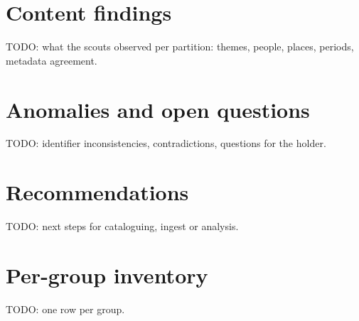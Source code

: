 \documentclass[11pt,a4paper]{article}
\begin{document}
\section{Content findings}
TODO: what the scouts observed per partition: themes, people, places,
periods, metadata agreement.

\section{Anomalies and open questions}
TODO: identifier inconsistencies, contradictions, questions for the holder.

\section{Recommendations}
TODO: next steps for cataloguing, ingest or analysis.

\appendix
\section{Per-group inventory}
TODO: one row per group.
\end{document}
